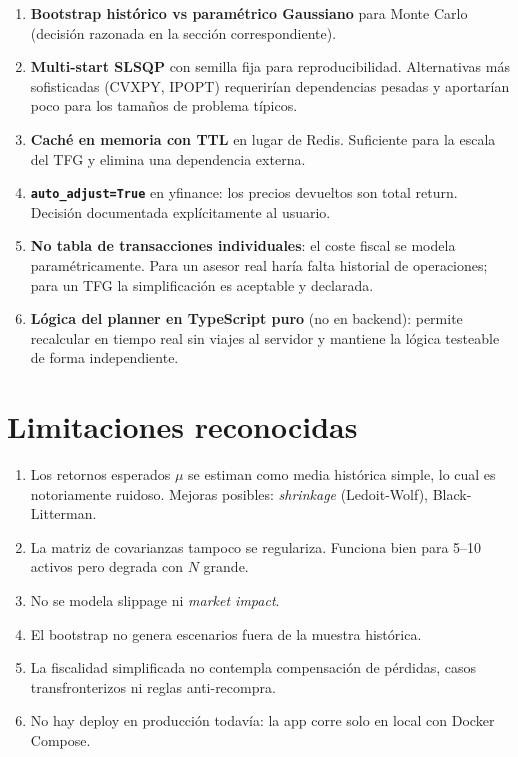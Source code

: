 \documentclass[11pt,a4paper]{article}
\begin{document}
\begin{enumerate}
  \item \textbf{Bootstrap histórico vs paramétrico Gaussiano} para Monte Carlo (decisión razonada en la sección correspondiente).
  \item \textbf{Multi-start SLSQP} con semilla fija para reproducibilidad. Alternativas más sofisticadas (CVXPY, IPOPT) requerirían dependencias pesadas y aportarían poco para los tamaños de problema típicos.
  \item \textbf{Caché en memoria con TTL} en lugar de Redis. Suficiente para la escala del TFG y elimina una dependencia externa.
  \item \textbf{\texttt{auto\_adjust=True}} en yfinance: los precios devueltos son total return. Decisión documentada explícitamente al usuario.
  \item \textbf{No tabla de transacciones individuales}: el coste fiscal se modela paramétricamente. Para un asesor real haría falta historial de operaciones; para un TFG la simplificación es aceptable y declarada.
  \item \textbf{Lógica del planner en TypeScript puro} (no en backend): permite recalcular en tiempo real sin viajes al servidor y mantiene la lógica testeable de forma independiente.
\end{enumerate}

\section{Limitaciones reconocidas}

\begin{enumerate}
  \item Los retornos esperados $\mu$ se estiman como media histórica simple, lo cual es notoriamente ruidoso. Mejoras posibles: \textit{shrinkage} (Ledoit-Wolf), Black-Litterman.
  \item La matriz de covarianzas tampoco se regulariza. Funciona bien para 5--10 activos pero degrada con $N$ grande.
  \item No se modela slippage ni \textit{market impact}.
  \item El bootstrap no genera escenarios fuera de la muestra histórica.
  \item La fiscalidad simplificada no contempla compensación de pérdidas, casos transfronterizos ni reglas anti-recompra.
  \item No hay deploy en producción todavía: la app corre solo en local con Docker Compose.
\end{enumerate}
\end{document}
